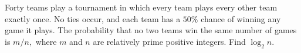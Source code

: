 Forty teams play a tournament in which every team plays every other team exactly once.  No ties occur, and each team has a $50 \%$ chance of winning any game it plays.  The probability that no two teams win the same number of games is $m/n,$ where $m$ and $n$ are relatively prime positive integers.  Find $\log_2 n.$